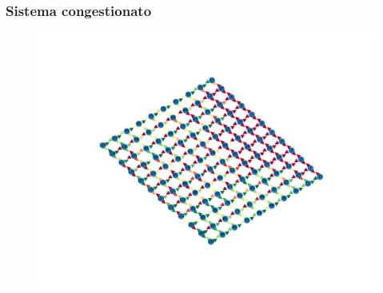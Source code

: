 \documentclass[
	11pt, %
]{beamer}
\begin{document}
\begin{frame}
	\frametitle{Sistema congestionato}
	\centering
	\begin{figure}
		\includegraphics[width=.8\textwidth, trim={12.5cm 8cm 10cm 8cm},clip]{congested_flow.png}
	\end{figure}
\end{frame}

	
\end{document}
